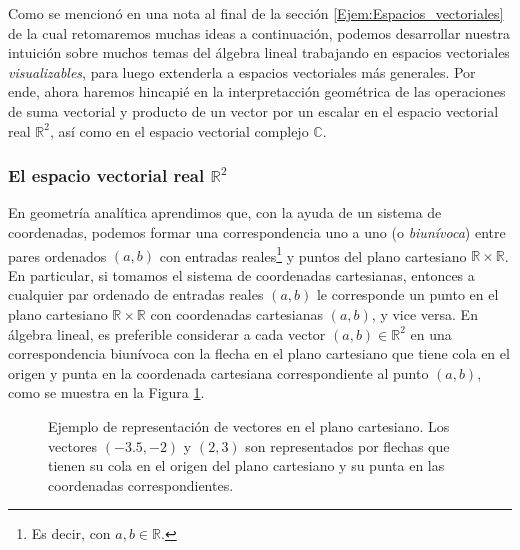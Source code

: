 \documentclass[notasLineal]{subfiles}
\begin{document}
Como se mencionó en una nota al final de la sección \ref{Ejem:Espacios_vectoriales} \hspace{1.5mm}\textemdash de la cual retomaremos muchas ideas a continuación\textemdash, podemos desarrollar nuestra intuición sobre muchos temas del álgebra lineal trabajando en espacios vectoriales \emph{visualizables}, para luego extenderla a espacios vectoriales más generales. Por ende, ahora haremos hincapié en la interpretacción geométrica de las operaciones de suma vectorial y producto de un vector por un escalar en el espacio vectorial real $\mathbb{R}^2$, así como en el espacio vectorial complejo $\mathbb{C}$.


\subsubsection*{El espacio vectorial real \texorpdfstring{$\mathbb{R}^2$}{TEXT}} \label{Sssec: El espacio vectorial real R^2}

En geometría analítica aprendimos que, con la ayuda de un sistema de coordenadas, podemos formar una correspondencia uno a uno (o \emph{biunívoca}) entre pares ordenados $(a,b)$ con entradas reales\footnote{Es decir, con $a,b\in\mathbb{R}$.} y puntos del plano cartesiano $\mathbb{R}\times\mathbb{R}$. En particular, si tomamos el sistema de coordenadas cartesianas, entonces a cualquier par ordenado de entradas reales $(a,b)$ le corresponde un punto en el plano cartesiano $\mathbb{R}\times\mathbb{R}$ con coordenadas cartesianas $(a,b)$, y vice versa. En álgebra lineal, es preferible considerar a cada vector $(a,b)\in\mathbb{R}^2$ en una correspondencia biunívoca con la flecha en el plano cartesiano que tiene cola en el origen y punta en la coordenada cartesiana correspondiente al punto $(a,b)$, como se muestra en la Figura \ref{fig:Correspondencias_del_plano_cartesiano}. \\

\begin{figure}[h!]
    \centering
    \caption{Ejemplo de representación de vectores en el plano cartesiano. Los vectores $(-3.5,-2)$ y $(2,3)$ son representados por flechas que tienen su cola en el origen del plano cartesiano y su punta en las coordenadas correspondientes.}
    \label{fig:Correspondencias_del_plano_cartesiano}
\end{figure}
\end{document}

